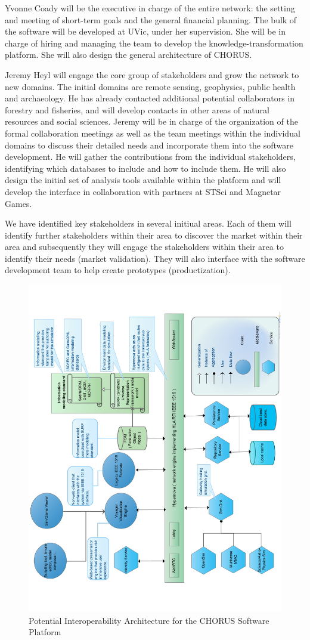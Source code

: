 Yvonne Coady will be the executive in charge of the entire network:
the setting and meeting of short-term goals and the general financial
planning.  The bulk of the software will be developed at UVic, under
her supervision. She will be in charge of hiring and managing the team
to develop the knowledge-transformation platform. She will also design
the general architecture of CHORUS.

Jeremy Heyl will engage the core group of stakeholders and grow the
network to new domains.  The initial domains are remote sensing,
geophysics, public health and archaeology.  He has already contacted
additional potential collaborators in forestry and fisheries, and will
develop contacts in other areas of natural resources and social
sciences.  Jeremy will be in charge of the organization of the formal
collaboration meetings as well as the team meetings within the
individual domains to discuss their detailed needs and incorporate
them into the software development. He will gather the contributions
from the individual stakeholders, identifying which databases to
include and how to include them.  He will also design the initial set
of analysis tools available within the platform and will develop the
interface in collaboration with partners at STSci and Magnetar Games.

We have identified key stakeholders in several initiual areas.  Each
of them will identify further stakeholders within their area to
discover the market within their area and subsequently they will
engage the stakeholders within their area to identify their needs
(market validation).  They will also interface with the software
development team to help create prototypes (productization).

\begin{figure}
  \includegraphics[height=\textwidth,angle=-90]{Arch2.pdf}
  \caption{Potential Interoperability Architecture for the CHORUS Software Platform}
\end{figure}


